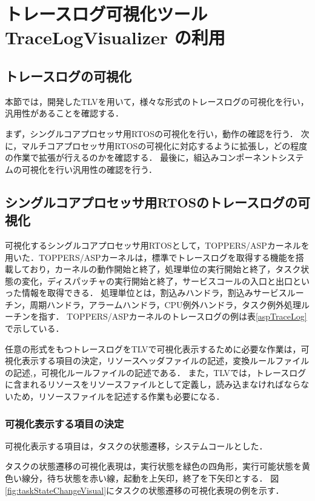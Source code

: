 \chapter{トレースログ可視化ツール TraceLogVisualizer の利用}

\section{トレースログの可視化}
本節では，開発したTLVを用いて，様々な形式のトレースログの可視化を行い，汎用性があることを確認する．

まず，シングルコアプロセッサ用RTOSの可視化を行い，動作の確認を行う．
次に，マルチコアプロセッサ用RTOSの可視化に対応するように拡張し，どの程度の作業で拡張が行えるのかを確認する．
最後に，組込みコンポーネントシステムの可視化を行い汎用性の確認を行う．
\fi

\section{シングルコアプロセッサ用RTOSのトレースログの可視化}
可視化するシングルコアプロセッサ用RTOSとして，TOPPERS/ASPカーネルを用いた．TOPPERS/ASPカーネルは，標準でトレースログを取得する機能を搭載しており，カーネルの動作開始と終了，処理単位の実行開始と終了，タスク状態の変化，ディスパッチャの実行開始と終了，サービスコールの入口と出口といった情報を取得できる．
処理単位とは，割込みハンドラ，割込みサービスルーチン，周期ハンドラ，アラームハンドラ，CPU例外ハンドラ，タスク例外処理ルーチンを指す．
TOPPERS/ASPカーネルのトレースログの例は表\ref{aspTraceLog}で示している．

任意の形式をもつトレースログをTLVで可視化表示するために必要な作業は，可視化表示する項目の決定，リソースヘッダファイルの記述，変換ルールファイルの記述,，可視化ルールファイルの記述である．
また，TLVでは，トレースログに含まれるリソースをリソースファイルとして定義し，読み込まなければならないため，リソースファイルを記述する作業も必要になる．

\subsection{可視化表示する項目の決定}
\label{subsec414}

可視化表示する項目は，タスクの状態遷移，システムコールとした．

タスクの状態遷移の可視化表現は，実行状態を緑色の四角形，実行可能状態を黄色い線分，待ち状態を赤い線，起動を上矢印，終了を下矢印とする．
図\ref{fig:taskStateChangeVisual}にタスクの状態遷移の可視化表現の例を示す．

